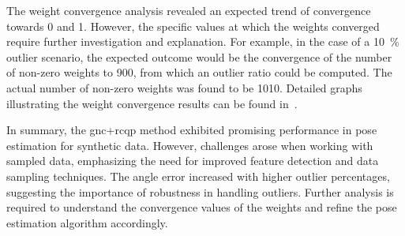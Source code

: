 The weight convergence analysis revealed an expected trend of convergence towards \num{0} and \num{1}. However, the specific values at which the weights converged require further investigation and explanation. For example, in the case of a \SI{10}{\percent} outlier scenario, the expected outcome would be the convergence of the number of non-zero weights to \num{900}, from which an outlier ratio could be computed. The actual number of non-zero weights was found to be \num{1010}. Detailed graphs illustrating the weight convergence results can be found in~.\medskip

In summary, the \gls{gnc}+\gls{rcqp} method exhibited promising performance in pose estimation for synthetic data. However, challenges arose when working with sampled data, emphasizing the need for improved feature detection and data sampling techniques. The angle error increased with higher outlier percentages, suggesting the importance of robustness in handling outliers. Further analysis is required to understand the convergence values of the weights and refine the pose estimation algorithm accordingly.
